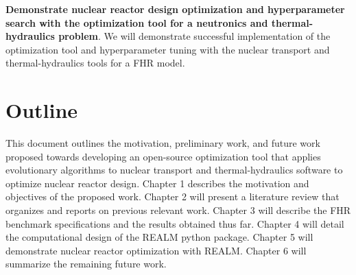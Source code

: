 \vspace{0.2cm} 
\noindent
\textbf{Demonstrate nuclear reactor design optimization and hyperparameter 
search with the optimization tool for a neutronics and thermal-hydraulics problem}.
We will demonstrate successful implementation of the optimization tool and 
hyperparameter tuning with the nuclear transport and thermal-hydraulics tools 
for a \gls{FHR} model.  


\section{Outline}
This document outlines the motivation, preliminary work, and future work proposed 
towards developing an open-source optimization tool that applies evolutionary 
algorithms to nuclear transport and thermal-hydraulics software to optimize 
nuclear reactor design. 
Chapter 1 describes the motivation and objectives of the proposed work. 
Chapter 2 will present a literature review that organizes and reports on previous 
relevant work. 
Chapter 3 will describe the \gls{FHR} benchmark specifications and the results 
obtained thus far. 
Chapter 4 will detail the computational design of the REALM python package. 
Chapter 5 will demonstrate nuclear reactor optimization with REALM. 
Chapter 6 will summarize the remaining future work. 
